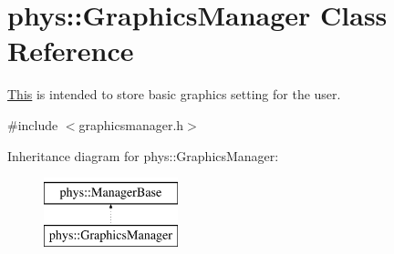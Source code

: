 \hypertarget{classphys_1_1GraphicsManager}{
\section{phys::GraphicsManager Class Reference}
\label{dd/d63/classphys_1_1GraphicsManager}
}


\hyperlink{structThis}{This} is intended to store basic graphics setting for the user.  




{\ttfamily \#include $<$graphicsmanager.h$>$}

Inheritance diagram for phys::GraphicsManager:\begin{figure}[H]
\begin{center}
\leavevmode
\includegraphics[height=2cm]{dd/d63/classphys_1_1GraphicsManager}
\end{center}
\end{figure}
